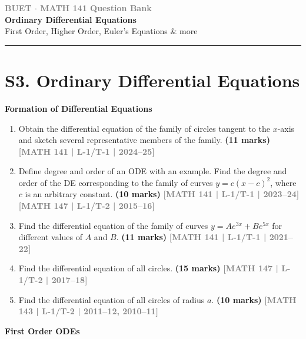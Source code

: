 \documentclass[12pt,a3paper]{article}
\newcommand{\yr}[1]{\hfill\textcolor{gray}{\small\textbf{[#1]}}}
\newcommand{\mk}[1]{\textcolor{orange!70!black}{\small\textbf{(#1 marks)}}}
\newcommand{\subtopic}[2]{%
  \vspace{10pt}
  \noindent\begin{tcolorbox}[colback=#1!8,colframe=#1,boxrule=0.6pt,arc=4pt,
    left=6pt,right=6pt,top=4pt,bottom=4pt]
    \small\bfseries\textcolor{#1}{#2}
  \end{tcolorbox}
  \vspace{2pt}
}
\newcommand{\secdivider}[3]{%
  \newpage\thispagestyle{empty}%
  \vspace*{\fill}%
  \begin{tcolorbox}[enhanced,colback=#3!6,colframe=#3,boxrule=1.5pt,arc=8pt,
    left=20pt,right=20pt,top=22pt,bottom=22pt,
    shadow={3pt}{-3pt}{0pt}{black!15}]
    \centering
    {\large\textcolor{gray}{\textbf{BUET $\cdot$ MATH 141 Question Bank}}}\\[8pt]
    {\fontsize{26}{32}\selectfont\bfseries\textcolor{#3}{#1}}\\[6pt]
    {\fontsize{15}{19}\selectfont\textcolor{dgray}{#2}}\\[12pt]
    \textcolor{#3!60}{\rule{0.5\textwidth}{0.5pt}}
  \end{tcolorbox}%
  \vspace*{\fill}\newpage%
}
\begin{document}

\secdivider{Ordinary Differential Equations}{First Order, Higher Order, Euler's Equations \& more}{cC}

\section{S3. Ordinary Differential Equations}
\label{sec:S3}

\subtopic{cC}{Formation of Differential Equations}
\label{sub:s3-formation}

\begin{enumerate}

\item Obtain the differential equation of the family of circles tangent to the $x$-axis and sketch several representative members of the family.
\mk{11}  \yr{MATH 141 | L-1/T-1 | 2024--25}
  
\item Define degree and order of an ODE with an example. Find the degree and order of the DE corresponding to the family of curves $y=c(x-c)^{2}$, where $c$ is an arbitrary constant.
\mk{10} \yr{MATH 141 | L-1/T-1 | 2023--24} \yr{MATH 147 | L-1/T-2 | 2015--16}

\item Find the differential equation of the family of curves $y=Ae^{3x}+Be^{5x}$ for different values of $A$ and $B$.
\mk{11} \yr{MATH 141 | L-1/T-1 | 2021--22}

\item Find the differential equation of all circles.
\mk{15} \yr{MATH 147 | L-1/T-2 | 2017--18}

\item Find the differential equation of all circles of radius $a$.
\mk{10\textonehalf} \yr{MATH 143 | L-1/T-2 | 2011--12, 2010--11}

\end{enumerate}
\subtopic{cC}{First Order ODEs}
\label{sub:s3-first}
\end{document}
